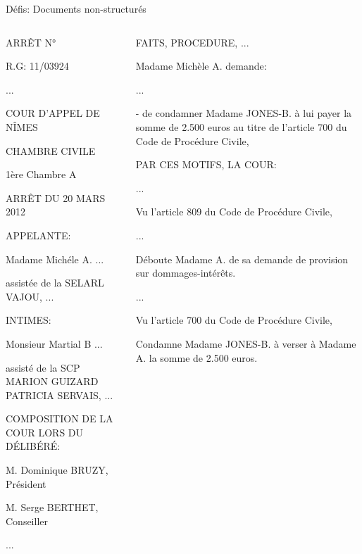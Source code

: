 \documentclass[newPxFont,pagenumber]{beamer}
\begin{document}
\begin{frame}{Défis: Documents non-structurés}
\scriptsize
\begin{columns}
\begin{column}{.50\linewidth}
ARRÊT N°

R.G: 11/03924

...

{COUR D'APPEL} DE {NÎMES}

{CHAMBRE CIVILE}

{1ère Chambre A}

ARRÊT DU {20 MARS 2012}

APPELANTE:

{Madame Michéle A.} ...

assistée de la {SELARL VAJOU}, ...

INTIMES:

{Monsieur Martial B} ...

assisté de la {SCP MARION GUIZARD PATRICIA SERVAIS}, ...

COMPOSITION DE LA COUR LORS DU DÉLIBÉRÉ:

{M. Dominique BRUZY, Président}

{M. Serge BERTHET, Conseiller}

...
\end{column}
\begin{column}{.50\linewidth}
FAITS, PROCEDURE, ...

Madame Michèle A. demande:

...

- de condamner Madame JONES-B. à lui payer la somme de {2.500 euros} au titre de l'{article 700 du Code de Procédure Civile}, 

\vspace{0.4cm}

PAR CES MOTIFS, LA COUR:

...

Vu l'{article 809 du Code de Procédure Civile},

...

{Déboute Madame A. de sa demande de provision sur dommages-intérêts.}

...

Vu l'{article 700 du Code de Procédure Civile},

Condamne Madame JONES-B. à verser à Madame A. la somme de {2.500 euros}.
\end{column}
\end{columns}
\end{frame}
\end{document}
